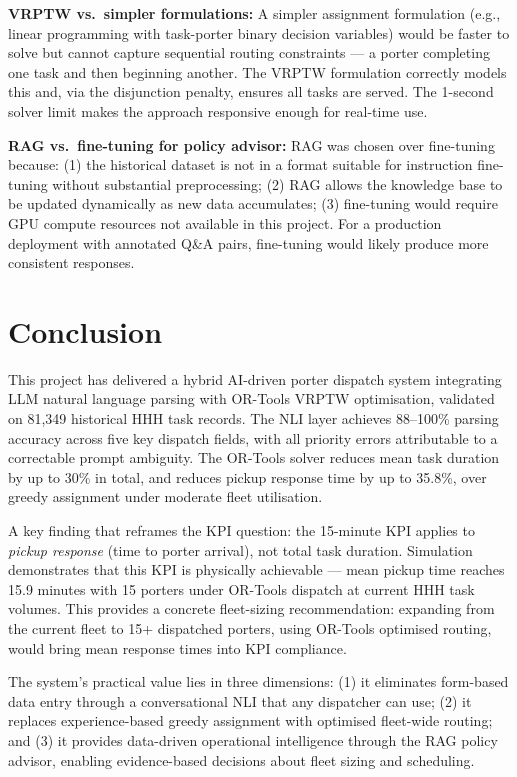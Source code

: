 \documentclass[12pt,a4paper]{article}
\begin{document}
\textbf{VRPTW vs.\ simpler formulations:} A simpler assignment formulation (e.g., linear programming with task-porter binary decision variables) would be faster to solve but cannot capture sequential routing constraints --- a porter completing one task and then beginning another. The VRPTW formulation correctly models this and, via the disjunction penalty, ensures all tasks are served. The 1-second solver limit makes the approach responsive enough for real-time use.

\textbf{RAG vs.\ fine-tuning for policy advisor:} RAG was chosen over fine-tuning because: (1) the historical dataset is not in a format suitable for instruction fine-tuning without substantial preprocessing; (2) RAG allows the knowledge base to be updated dynamically as new data accumulates; (3) fine-tuning would require GPU compute resources not available in this project. For a production deployment with annotated Q\&A pairs, fine-tuning would likely produce more consistent responses.

\section{Conclusion}

This project has delivered a hybrid AI-driven porter dispatch system integrating LLM natural language parsing with OR-Tools VRPTW optimisation, validated on 81,349 historical HHH task records. The NLI layer achieves 88--100\% parsing accuracy across five key dispatch fields, with all priority errors attributable to a correctable prompt ambiguity. The OR-Tools solver reduces mean task duration by up to 30\% in total, and reduces pickup response time by up to 35.8\%, over greedy assignment under moderate fleet utilisation.

A key finding that reframes the KPI question: the 15-minute KPI applies to \textit{pickup response} (time to porter arrival), not total task duration. Simulation demonstrates that this KPI is physically achievable --- mean pickup time reaches 15.9 minutes with 15 porters under OR-Tools dispatch at current HHH task volumes. This provides a concrete fleet-sizing recommendation: expanding from the current fleet to 15+ dispatched porters, using OR-Tools optimised routing, would bring mean response times into KPI compliance.

The system's practical value lies in three dimensions: (1) it eliminates form-based data entry through a conversational NLI that any dispatcher can use; (2) it replaces experience-based greedy assignment with optimised fleet-wide routing; and (3) it provides data-driven operational intelligence through the RAG policy advisor, enabling evidence-based decisions about fleet sizing and scheduling.
\end{document}
